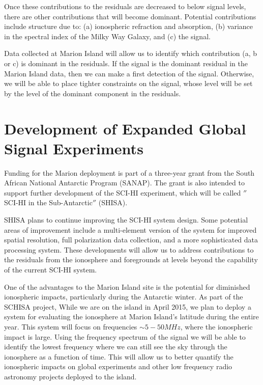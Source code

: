 Once these contributions to the residuals are decreased to below \cm signal levels, there are other contributions that will become dominant. Potential contributions include structure due to: (a) ionospheric refraction and absorption, (b) variance in the spectral index of the Milky Way Galaxy, and (c) the \cm signal. 

Data collected at Marion Island will allow us to identify which contribution (a, b or c) is dominant in the residuals. If the \cm signal is the dominant residual in the Marion Island data, then we can make a first detection of the \cm signal. Otherwise, we will be able to place tighter constraints on the \cm signal, whose level will be set by the level of the dominant component in the residuals. 

\section{Development of Expanded Global \cm Signal Experiments}

Funding for the Marion deployment is part of a three-year grant from the South African National Antarctic Program (SANAP). The grant is also intended to support further development of the SCI-HI experiment, which will be called $''$SCI-HI in the Sub-Antarctic$''$ (SHISA). 

SHISA plans to continue improving the SCI-HI system design. Some potential areas of improvement include a multi-element version of the system for improved spatial resolution, full polarization data collection, and a more sophisticated data processing system. These developments will allow us to address contributions to the residuals from the ionosphere and foregrounds at levels beyond the capability of the current SCI-HI system.

One of the advantages to the Marion Island site is the potential for diminished ionospheric impacts, particularly during the Antarctic winter. As part of the SCHISA project, While we are on the island in April 2015, we plan to deploy a system for evaluating the ionosphere at Marion Island's latitude during the entire year. This system will focus on frequencies $\sim5-50 MHz$, where the ionospheric impact is large. Using the frequency spectrum of the signal we will be able to identify the lowest frequency where we can still see the sky through the ionosphere as a function of time. This will allow us to better quantify the ionospheric impacts on global \cm experiments and other low frequency radio astronomy projects deployed to the island. 